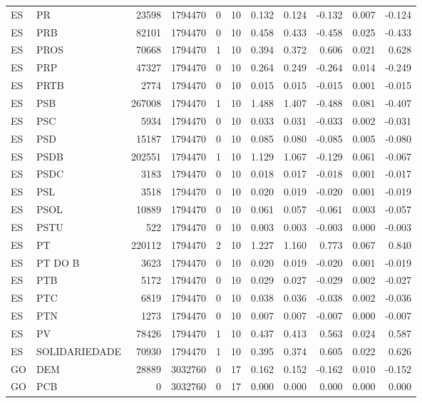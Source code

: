 \begin{landscape}
\begin{longtable}{llrrrrrrrrr}
ES & PR & 23598 & 1794470 & 0 & 10 & 0.132 & 0.124 & -0.132 & 0.007 & -0.124 \\
ES & PRB & 82101 & 1794470 & 0 & 10 & 0.458 & 0.433 & -0.458 & 0.025 & -0.433 \\
ES & PROS & 70668 & 1794470 & 1 & 10 & 0.394 & 0.372 & 0.606 & 0.021 & 0.628 \\
ES & PRP & 47327 & 1794470 & 0 & 10 & 0.264 & 0.249 & -0.264 & 0.014 & -0.249 \\
ES & PRTB & 2774 & 1794470 & 0 & 10 & 0.015 & 0.015 & -0.015 & 0.001 & -0.015 \\
ES & PSB & 267008 & 1794470 & 1 & 10 & 1.488 & 1.407 & -0.488 & 0.081 & -0.407 \\
ES & PSC & 5934 & 1794470 & 0 & 10 & 0.033 & 0.031 & -0.033 & 0.002 & -0.031 \\
ES & PSD & 15187 & 1794470 & 0 & 10 & 0.085 & 0.080 & -0.085 & 0.005 & -0.080 \\
ES & PSDB & 202551 & 1794470 & 1 & 10 & 1.129 & 1.067 & -0.129 & 0.061 & -0.067 \\
ES & PSDC & 3183 & 1794470 & 0 & 10 & 0.018 & 0.017 & -0.018 & 0.001 & -0.017 \\
ES & PSL & 3518 & 1794470 & 0 & 10 & 0.020 & 0.019 & -0.020 & 0.001 & -0.019 \\
ES & PSOL & 10889 & 1794470 & 0 & 10 & 0.061 & 0.057 & -0.061 & 0.003 & -0.057 \\
ES & PSTU & 522 & 1794470 & 0 & 10 & 0.003 & 0.003 & -0.003 & 0.000 & -0.003 \\
ES & PT & 220112 & 1794470 & 2 & 10 & 1.227 & 1.160 & 0.773 & 0.067 & 0.840 \\
ES & PT DO B & 3623 & 1794470 & 0 & 10 & 0.020 & 0.019 & -0.020 & 0.001 & -0.019 \\
ES & PTB & 5172 & 1794470 & 0 & 10 & 0.029 & 0.027 & -0.029 & 0.002 & -0.027 \\
ES & PTC & 6819 & 1794470 & 0 & 10 & 0.038 & 0.036 & -0.038 & 0.002 & -0.036 \\
ES & PTN & 1273 & 1794470 & 0 & 10 & 0.007 & 0.007 & -0.007 & 0.000 & -0.007 \\
ES & PV & 78426 & 1794470 & 1 & 10 & 0.437 & 0.413 & 0.563 & 0.024 & 0.587 \\
ES & SOLIDARIEDADE & 70930 & 1794470 & 1 & 10 & 0.395 & 0.374 & 0.605 & 0.022 & 0.626 \\
GO & DEM & 28889 & 3032760 & 0 & 17 & 0.162 & 0.152 & -0.162 & 0.010 & -0.152 \\
GO & PCB & 0 & 3032760 & 0 & 17 & 0.000 & 0.000 & 0.000 & 0.000 & 0.000 \\

\end{longtable}
\end{landscape}
